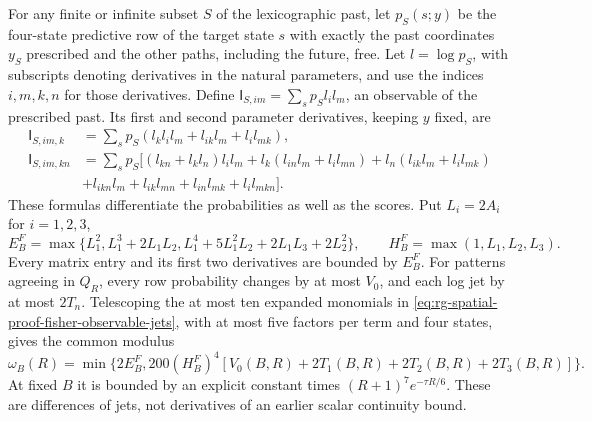 For any finite or infinite subset \(S\) of the lexicographic past, let
\(p_S(s;y)\) be the four-state predictive row of the target state \(s\) with
exactly the past coordinates \(y_S\) prescribed and the other paths,
including the future, free. Let \(l=\log p_S\), with subscripts denoting
derivatives in the natural parameters, and use the indices \(i,m,k,n\) for
those derivatives. Define \(\mathsf I_{S,im}=\sum_sp_Sl_il_m\), an
observable of the prescribed past. Its first and second parameter
derivatives, keeping \(y\) fixed, are
\begin{equation}
 \begin{split}
 \mathsf I_{S,im,k}
 &=\sum_sp_S(l_kl_il_m+l_{ik}l_m+l_il_{mk}),\\
 \mathsf I_{S,im,kn}
 &=\sum_sp_S\bigl[(l_{kn}+l_kl_n)l_il_m
 +l_k(l_{in}l_m+l_il_{mn})+l_n(l_{ik}l_m+l_il_{mk})\\
 &+l_{ikn}l_m+l_{ik}l_{mn}+l_{in}l_{mk}+l_il_{mkn}\bigr].
 \end{split}
 \label{eq:rg-spatial-proof-fisher-observable-jets}
\end{equation}
These formulas differentiate the probabilities as well as the scores. Put
\(L_i=2A_i\) for \(i=1,2,3\),
\begin{equation}
 E_B^F=\max\{L_1^2,L_1^3+2L_1L_2,
                L_1^4+5L_1^2L_2+2L_1L_3+2L_2^2\},\qquad
 H_B^F=\max(1,L_1,L_2,L_3).
 \label{eq:rg-spatial-proof-fisher-observable-bound}
\end{equation}
Every matrix entry and its first two derivatives are bounded by \(E_B^F\).
For patterns agreeing in \(Q_R\), every row probability changes by at most
\(V_0\), and each log jet by at most \(2T_n\). Telescoping the at most ten
expanded monomials in \cref{eq:rg-spatial-proof-fisher-observable-jets},
with at most five factors per term and four states, gives the common
modulus
\begin{equation}
 \omega_B(R)=\min\{2E_B^F,
 200(H_B^F)^4[V_0(B,R)+2T_1(B,R)+2T_2(B,R)+2T_3(B,R)]\}.
 \label{eq:rg-spatial-proof-fisher-observable-modulus}
\end{equation}
At fixed \(B\) it is bounded by an explicit constant times
\((R+1)^7e^{-\tau R/6}\). These are differences of jets, not derivatives of
an earlier scalar continuity bound.

